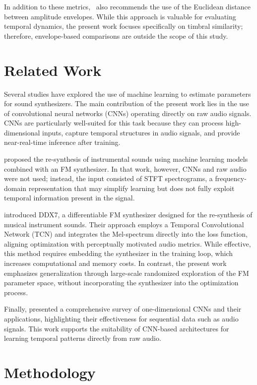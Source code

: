 \documentclass[10pt,conference]{IEEEtran}
\begin{document}
In addition to these metrics,~\cite{claesson2021resynthesis} also recommends the use of the Euclidean distance between amplitude envelopes. While this approach is valuable for evaluating temporal dynamics, the present work focuses specifically on timbral similarity; therefore, envelope-based comparisons are outside the scope of this study.

\section{Related Work} \label{sec:related}

Several studies have explored the use of machine learning to estimate parameters for sound synthesizers. The main contribution of the present work lies in the use of convolutional neural networks (CNNs) operating directly on raw audio signals. CNNs are particularly well-suited for this task because they can process high-dimensional inputs, capture temporal structures in audio signals, and provide near-real-time inference after training.

\cite{claesson2021resynthesis} proposed the re-synthesis of instrumental sounds using machine learning models combined with an FM synthesizer. In that work, however, CNNs and raw audio were not used; instead, the input consisted of STFT spectrograms, a frequency-domain representation that may simplify learning but does not fully exploit temporal information present in the signal.

\cite{steinmetz2022ddx7} introduced DDX7, a differentiable FM synthesizer designed for the re-synthesis of musical instrument sounds. Their approach employs a Temporal Convolutional Network (TCN) and integrates the Mel-spectrum directly into the loss function, aligning optimization with perceptually motivated audio metrics. While effective, this method requires embedding the synthesizer in the training loop, which increases computational and memory costs. In contrast, the present work emphasizes generalization through large-scale randomized exploration of the FM parameter space, without incorporating the synthesizer into the optimization process.

Finally, \cite{kiranyaz2021survey} presented a comprehensive survey of one-dimensional CNNs and their applications, highlighting their effectiveness for sequential data such as audio signals. This work supports the suitability of CNN-based architectures for learning temporal patterns directly from raw audio.

\section{Methodology} \label{sec:our_proposal}
\end{document}
